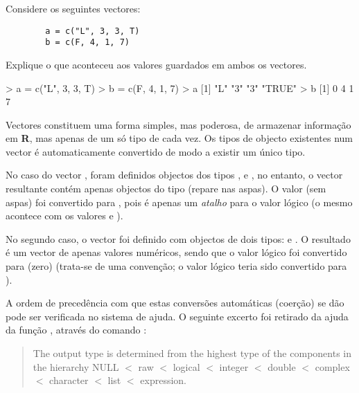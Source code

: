 \documentclass{exam}
\begin{document}
\begin{questions}
\question Considere os seguintes vectores:

	\begin{verbatim}
		a = c("L", 3, 3, T)
		b = c(F, 4, 1, 7)
	\end{verbatim}

Explique o que aconteceu aos valores guardados em ambos os vectores.

\begin{solution}
	\begin{rcode}
		> a = c("L", 3, 3, T)
		> b = c(F, 4, 1, 7)
		> a
		[1] "L"    "3"    "3"    "TRUE"
		> b
		[1] 0 4 1 7
	\end{rcode}
	Vectores constituem uma forma simples, mas poderosa, de armazenar informação em \textbf{R}, mas apenas de um só tipo de cada vez. Os tipos de objecto existentes num vector é automaticamente convertido de modo a existir um único tipo.
	
	No caso do vector , foram definidos objectos dos tipos ,  e , no entanto, o vector resultante contém apenas objectos do tipo  (repare nas aspas). O valor  (sem aspas) foi convertido para , pois  é apenas um \textit{atalho} para o valor lógico  (o mesmo acontece com os valores  e ).
	
	No segundo caso, o vector  foi definido com objectos de dois tipos:  e . O resultado é um vector de apenas valores numéricos, sendo que o valor lógico  foi convertido para  (zero) (trata-se de uma convenção; o valor lógico  teria sido convertido para ).
	
	A ordem de precedência com que estas conversões automáticas (coerção) se dão pode ser verificada no sistema de ajuda. O seguinte excerto foi retirado da ajuda da função , através do comando :
	
	\begin{quote}
		The output type is determined from the highest type of the components in the hierarchy NULL $<$ raw $<$ logical $<$ integer $<$ double $<$ complex $<$ character $<$ list $<$ expression.
	\end{quote}

\end{solution}

\end{questions}
\end{document}
